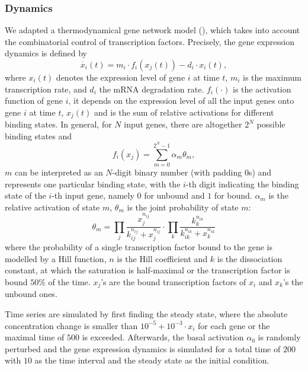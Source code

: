 \subsubsection{Dynamics}
We adapted a thermodynamical gene network model 
(\citealp{Schilstra2002,Marbach2010,Schaffter2011}),
which takes into account the combinatorial control of transcription factors. 
Precisely, the 
gene expression dynamics is defined by 
\begin{equation}
  \dot{x_i}(t) = m_i \cdot f_i(x_j(t)) - d_i \cdot x_i(t), 
\label{eq:gnw_model}
\end{equation}
where $x_i(t)$ denotes the expression level of gene $i$ at time $t$, 
$m_i$ is the 
maximum transcription rate, and $d_i$ the mRNA degradation rate. $f_i(\cdot)$
is the activation function of gene $i$, it depends on the expression level of 
all the input genes onto gene $i$ at time $t$, $x_j(t)$ and is the sum of relative 
activations for
different binding states. In general, for $N$ input genes, there are altogether
$2^N$ possible binding states and
\begin{equation}
  \displaystyle f_i(x_j) = \sum_{m=0}^{2^N-1} \alpha_m \theta_m,
\end{equation}
$m$ can be interpreted as an $N$-digit binary number (with padding $0$s) 
and represents one particular binding state, with the $i$-th
digit indicating the binding state of the $i$-th input gene, namely $0$ for unbound
and $1$ for bound. $\alpha_m$ is the relative activation of state $m$,
$\theta_m$ is the joint probability of state $m$: 
\begin{equation}
  \theta_{m} = \prod_j \frac{x_j^{n_{ij}}}{k_{ij}^{n_{ij}}+x_j^{n_{ij}}}
    \cdot \prod_k \frac{k_k^{n_{ik}}}{k_{ik}^{n_{ik}}+x_k^{n_{ik}}}
\end{equation}
where the probability of a single transcription factor bound to the gene is 
modelled by a Hill function,
$n$ is the Hill coefficient and $k$ is the dissociation constant, at which the
saturation is half-maximal or the transcription factor is bound $50\%$ of the time.
$x_j$'s are the bound transcription factors of $x_i$ and $x_k$'s the unbound ones.

Time series are simulated by first finding the steady state, where the absolute
concentration change is smaller than $10^{-5} + 10^{-3} \cdot x_i$ for each gene
or the maximal time of $500$ is exceeded. Afterwards, the basal activation $\alpha_0$
is randomly perturbed and the gene expression dynamics is simulated for a total
time of $200$ with $10$ as the time interval and the
steady state as the initial condition.

